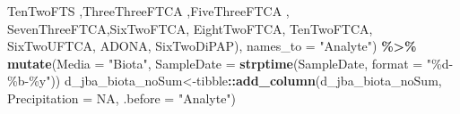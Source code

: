 \documentclass[
]{article}
\newenvironment{Shaded}{\begin{snugshade}}{\end{snugshade}}
\newcommand{\AttributeTok}[1]{\textcolor[rgb]{0.13,0.29,0.53}{#1}}
\newcommand{\ConstantTok}[1]{\textcolor[rgb]{0.56,0.35,0.01}{#1}}
\newcommand{\FunctionTok}[1]{\textcolor[rgb]{0.13,0.29,0.53}{\textbf{#1}}}
\newcommand{\NormalTok}[1]{#1}
\newcommand{\OtherTok}[1]{\textcolor[rgb]{0.56,0.35,0.01}{#1}}
\newcommand{\SpecialCharTok}[1]{\textcolor[rgb]{0.81,0.36,0.00}{\textbf{#1}}}
\newcommand{\StringTok}[1]{\textcolor[rgb]{0.31,0.60,0.02}{#1}}
\begin{document}
\begin{Shaded}
\begin{Highlighting}[]
\NormalTok{                TenTwoFTS  ,ThreeThreeFTCA ,FiveThreeFTCA ,}
\NormalTok{                SevenThreeFTCA,SixTwoFTCA, EightTwoFTCA, }
\NormalTok{                TenTwoFTCA, SixTwoUFTCA, ADONA, }
\NormalTok{                SixTwoDiPAP),}
         \AttributeTok{names\_to =} \StringTok{"Analyte"}\NormalTok{) }\SpecialCharTok{\%\textgreater{}\%}
  \FunctionTok{mutate}\NormalTok{(}\AttributeTok{Media =} \StringTok{"Biota"}\NormalTok{,}
         \AttributeTok{SampleDate =} \FunctionTok{strptime}\NormalTok{(SampleDate, }\AttributeTok{format =} \StringTok{"\%d{-}\%b{-}\%y"}\NormalTok{))}
\NormalTok{d\_jba\_biota\_noSum}\OtherTok{\textless{}{-}}\NormalTok{tibble}\SpecialCharTok{::}\FunctionTok{add\_column}\NormalTok{(d\_jba\_biota\_noSum, }\AttributeTok{Precipitation =} \ConstantTok{NA}\NormalTok{, }\AttributeTok{.before =} \StringTok{"Analyte"}\NormalTok{)}
\end{Highlighting}
\end{Shaded}
\end{document}
